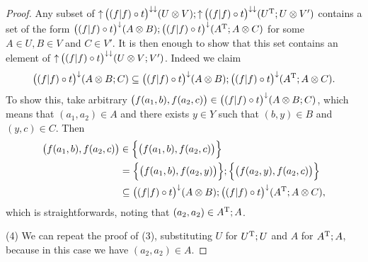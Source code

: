 \begin{proof}
Any subset of $\operatorname{\uparrow}\big((f|f)\circ t \big)^{\downarrow\downarrow}(U\otimes V);\operatorname{\uparrow}\big((f|f)\circ t \big)^{\downarrow\downarrow}(U^{\mathrm{T}};U\otimes V')$ contains a set of the form $\big((f|f)\circ t \big)^{\downarrow}(A\otimes B);\big((f|f)\circ t \big)^{\downarrow}(A^{\mathrm{T}};A\otimes C)$ for some $A\in U, B\in V$ and $C\in V'$. It is then enough to show that this set contains an element of $\operatorname{\uparrow}\big((f|f)\circ t \big)^{\downarrow\downarrow}(U\otimes V;V')$. Indeed we claim
\[ \big((f|f)\circ t \big)^{\downarrow}(A\otimes B;C) \subseteq \big((f|f)\circ t \big)^{\downarrow}(A\otimes B);\big((f|f)\circ t \big)^{\downarrow}(A^{\mathrm{T}};A\otimes C). \]
To show this, take arbitrary $\big(f(a_1, b), f(a_2, c)\big) \in \big((f|f)\circ t \big)^{\downarrow}(A\otimes B;C)$, which means that $(a_1, a_2)\in A$ and there exists $y\in Y$ such that $(b,y)\in B$ and $(y,c)\in C$. Then
\begin{align*}
\big(f(a_1, b), f(a_2, c)\big) &\in \Big\{\big(f(a_1, b),f(a_2, c) \big)\Big\} \\
&= \Big\{\big(f(a_1, b),f(a_2, y) \big)\Big\}; \Big\{\big(f(a_2, y), f(a_2, c)\big)\Big\} \\
&\subseteq \big((f|f)\circ t \big)^{\downarrow}(A\otimes B);\big((f|f)\circ t \big)^{\downarrow}(A^{\mathrm{T}};A\otimes C),
\end{align*}
which is straightforwards, noting that $(a_2,a_2)\in A^{\mathrm{T}}; A$.

(4) We can repeat the proof of (3), substituting $U$ for $U^{\mathrm{T}};U$ and $A$ for $A^{\mathrm{T}};A$, because in this case we have $(a_2, a_2)\in A$.
\end{proof}

